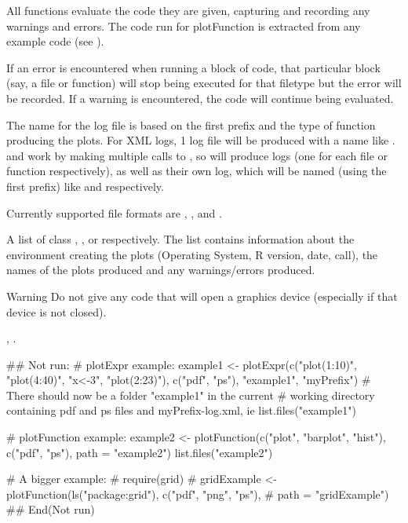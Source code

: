 \documentclass[a4paper,oneside]{report}
\begin{document}
\begin{Details}\relax
All functions evaluate the code they are given, capturing and recording any
warnings and errors. The code run for plotFunction is extracted from
any example code (see ).

If an error is encountered when running a block of code, that
particular block (say, a file or function) will stop being executed
for that filetype but the error will be recorded. If a warning is
encountered, the code will continue being evaluated.

The name for the log file is based on the first prefix and the type of
function producing the plots. For  XML logs, 1 log file
will be produced with a name like .
 and  work by making multiple calls
to , so will produce  logs (one for each
file or function respectively), as well as their own log, which will
be named (using the first prefix) like  and
 respectively.

Currently supported file formats are , , and
.
\end{Details}
\begin{Value}
A list of class , , or
 respectively. The list contains
information about the environment creating the plots (Operating
System, R version, date, call), the names of the plots produced and
any warnings/errors produced.
\end{Value}
\begin{Section}{Warning}
Do not give any code that will open a graphics device (especially if
that device is not closed).
\end{Section}
\begin{SeeAlso}\relax
{}, .
\end{SeeAlso}
\begin{Examples}
\begin{ExampleCode}
## Not run: 
  # plotExpr example:
  example1 <- plotExpr(c("plot(1:10)", "plot(4:40)", "x<-3", "plot(2:23)"),
                       c("pdf", "ps"), "example1", "myPrefix")
  # There should now be a folder "example1" in the current
  # working directory containing pdf and ps files and myPrefix-log.xml, ie
  list.files("example1")

  # plotFunction example:
  example2 <- plotFunction(c("plot", "barplot", "hist"), c("pdf", "ps"),
                           path = "example2")
  list.files("example2")

  # A bigger example:
  # require(grid)
  # gridExample <- plotFunction(ls("package:grid"), c("pdf", "png", "ps"),
  #                             path = "gridExample")
## End(Not run)
\end{ExampleCode}
\end{Examples}
\end{document}
